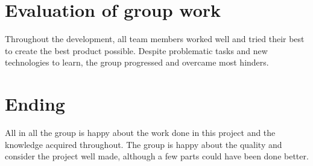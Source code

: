 \section{Evaluation of group work}
Throughout the development, all team members worked well and tried their best to create the best product possible. Despite problematic tasks and new technologies to learn, the group progressed and overcame most hinders.

\section{Ending}
All in all the group is happy about the work done in this project and the knowledge acquired throughout. The group is happy about the quality and consider the project well made, although a few parts could have been done better.
